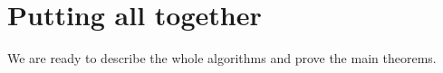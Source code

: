 \section{Putting all together}
We are ready to describe the whole algorithms and prove the main theorems.